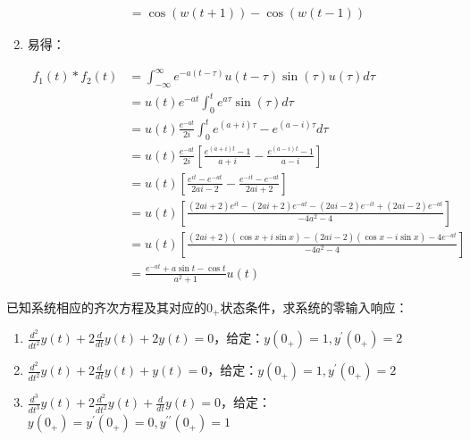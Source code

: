 \documentclass[answers]{exam}  %
\begin{document}
\begin{questions}
\begin{solution}
\begin{enumerate}[(1)]
\begin{large}
\begin{align*}
			     &=\cos(w(t+1))-\cos(w(t-1))
		      \end{align*} 
	          \end{large}
		\item 易得：
		      \begin{large}
		      \begin{align*}
		      	f_1(t)\ast f_2(t)
			    &=\int_{-\infty}^{\infty} e^{-a(t-\tau)}u(t-\tau)\sin(\tau) u(\tau)d\tau\\
			    &=u(t)e^{-at}\int_{0}^{t} e^{a\tau}\sin(\tau) d\tau\\
			    &=u(t)\frac{e^{-at}}{2i}\int_{0}^{t} e^{(a+i)\tau}-e^{(a-i)\tau} d\tau\\
			    &=u(t)\frac{e^{-at}}{2i}[\frac{e^{(a+i)t}-1}{a+i}-\frac{e^{(a-i)t}-1}{a-i}]\\
			    &=u(t)[\frac{e^{it}-e^{-at}}{2ai-2}-\frac{e^{-it}-e^{-at}}{2ai+2}]\\
			    &=u(t)[\frac{(2ai+2)e^{it}-(2ai+2)e^{-at}-(2ai-2)e^{-it}+(2ai-2)e^{-at}}{-4a^2-4}]\\
			    &=u(t)[\frac{(2ai+2)(\cos x+i\sin x)-(2ai-2)(\cos x-i\sin x)-4e^{-at}}{-4a^2-4}]\\
			    &=\frac{e^{-at}+a\sin t-\cos t}{a^2+1}u(t)
		      \end{align*}
              \end{large}
	\end{enumerate}
\end{solution}


\question 已知系统相应的齐次方程及其对应的$0_{+}$状态条件，求系统的零输入响应：
\begin{enumerate}[(1)]
	\item $\frac{d^2}{dt^2}y(t)+2\frac{d}{dt}y(t)+2y(t)=0$，给定：$y(0_{+})=1,y^{\prime}(0_{+})=2$
	\item $\frac{d^2}{dt^2}y(t)+2\frac{d}{dt}y(t)+y(t)=0$，给定：$y(0_{+})=1,y^{\prime}(0_{+})=2$
	\item $\frac{d^3}{dt^3}y(t)+2\frac{d^2}{dt^2}y(t)+\frac{d}{dt}y(t)=0$，给定：$y(0_{+})=y^{\prime}(0_{+})=0,y^{\prime\prime}(0_{+})=1$
\end{enumerate}


\end{questions}
\end{document}
